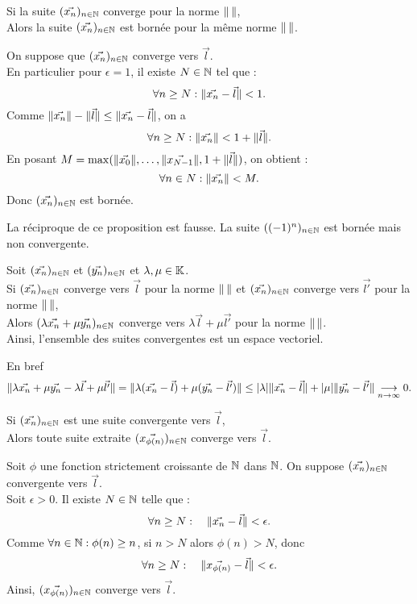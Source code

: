 \documentclass{book}
\begin{document}
\begin{Proposition}
Si la suite $(\vec{x_n})_{n\in\mathbb{N}}$ converge pour la norme $\mathopen\lVert \, \mathclose\rVert$,\\
Alors la suite $(\vec{x_n})_{n\in\mathbb{N}}$ est bornée pour la même norme $\mathopen\lVert \, \mathclose\rVert$.
\end{Proposition}
\begin{Demonstration}
On suppose que $(\vec{x_n})_{n\in\mathbb{N}}$ converge vers $\vec{l}$.\\
En particulier pour $\epsilon=1$, il existe $N\in\mathbb{N}$ tel que :
$$\forall n\geq N:\mathopen\lVert \vec{x_n}-\vec{l} \mathclose\rVert<1.$$
 Comme $\mathopen\lVert \vec{x_n} \mathclose\rVert-\mathopen\lVert \vec{l} \mathclose\rVert \leq \mathopen\lVert \vec{x_n}-\vec{l} \mathclose\rVert$, on a 
$$\forall n\geq N:\mathopen\lVert \vec{x_n} \mathclose\rVert<1+\mathopen\lVert \vec{l} \mathclose\rVert.$$
En posant $M=\max(\mathopen\lVert \vec{x_0} \mathclose\rVert,\dots,\mathopen\lVert \vec{x_{N-1}} \mathclose\rVert,1+\mathopen\lVert \vec{l} \mathclose\rVert )$, on obtient :
$$\forall n\in N:\mathopen\lVert \vec{x_n} \mathclose\rVert<M.$$
Donc $(\vec{x_n})_{n\in\mathbb{N}}$ est bornée.
\end{Demonstration}
\begin{Remarque}
La réciproque de ce proposition est fausse. La suite $((-1)^n)_{n\in\mathbb{N}}$ est bornée mais non convergente.
\end{Remarque}
\begin{Proposition}
Soit $(\vec{x_n})_{n\in\mathbb{N}}$ et $(\vec{y_n})_{n\in\mathbb{N}}$ et $\lambda , \mu \in\mathbb{K}$.\\
Si  $(\vec{x_n})_{n\in\mathbb{N}}$ converge vers $\vec{l}$ pour la norme $\mathopen\lVert \, \mathclose\rVert$ et  $(\vec{x_n})_{n\in\mathbb{N}}$ converge vers $\vec{l'}$ pour la norme $\mathopen\lVert \, \mathclose\rVert$,\\
Alors $(\lambda\vec{x_n}+\mu\vec{y_n} )_{n\in\mathbb{N}}$ converge vers $\lambda\vec{l}+\mu\vec{l'}$  pour la norme $\mathopen\lVert \, \mathclose\rVert$.\\
Ainsi, l'ensemble des suites convergentes est un espace vectoriel. 
\end{Proposition}
\begin{Demonstration}
En bref $$\norme{\lambda\vec{x_n}+\mu\vec{y_n}  -\lambda\vec{l}+\mu\vec{l'} } =\norme{\lambda(\vec{x_n}-\vec{l}) +\mu(\vec{y_n}-\vec{l'}) }\leq |\lambda|\norme{\vec{x_n}-\vec{l}} +|\mu|\norme{\vec{y_n}-\vec{l'}}\tend[n\to\infty] 0.$$
\end{Demonstration}
\begin{Proposition}
Si $(\vec{x_n})_{n\in\mathbb{N}}$ est une suite convergente vers $\vec{l}$,\\
Alors toute suite extraite $(\vec{x_{\phi(n)}})_{n\in\mathbb{N}}$ converge vers $\vec{l}$. 
\end{Proposition}
\begin{Demonstration}
Soit $\phi$ une fonction strictement croissante de $\mathbb{N}$ dans $\mathbb{N}$.
On suppose $(\vec{x_n})_{n\in\mathbb{N}}$ convergente vers $\vec{l}$.\\
Soit $\epsilon>0$. Il existe $N\in\mathbb{N}$ telle que :
$$\forall n\geq N:\quad \mathopen\lVert \vec{x_n}-\vec{l} \mathclose\rVert<\epsilon.$$
Comme $\forall n\in\mathbb{N}: \phi(n)\geq n$, si $n>N$ alors $\phi(n)>N$, donc    
$$\forall n\geq N:\quad \mathopen\lVert \vec{x_{\phi(n)}}-\vec{l} \mathclose\rVert<\epsilon.$$
Ainsi, $(\vec{x_{\phi(n)}})_{n\in\mathbb{N}}$ converge vers $\vec{l}$. 
\end{Demonstration}
\end{document}
